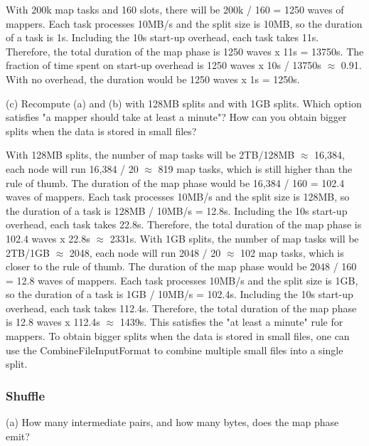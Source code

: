 \documentclass[11pt,a4paper]{article}
\begin{document}
With 200k map tasks and 160 slots, there will be 200k / 160 = 1250 waves of mappers. Each task processes 10MB/s and the split size is 10MB, so the duration of a task is 1s. Including the 10s start-up overhead, each task takes 11s. Therefore, the total duration of the map phase is 1250 waves x 11s = 13750s. 
The fraction of time spent on start-up overhead is 1250 waves x 10s / 13750s $\approx$ 0.91. With no overhead, the duration would be 1250 waves x 1s = 1250s.

\begin{tcolorbox}[colback=gray!20,colframe=gray!20, sharp corners]
(c) Recompute (a) and (b) with 128MB splits and with 1GB splits. Which option satisfies "a mapper should take at least a minute"? How can you obtain bigger splits when the data is stored in small files?
\end{tcolorbox}

With 128MB splits, the number of map tasks will be 2TB/128MB $\approx$ 16,384, each node will run 16,384 / 20 $\approx$ 819 map tasks, which is still higher than the rule of thumb. \newline
The duration of the map phase would be 16,384 / 160 = 102.4 waves of mappers. Each task processes 10MB/s and the split size is 128MB, so the duration of a task is 128MB / 10MB/s = 12.8s. Including the 10s start-up overhead, each task takes 22.8s. Therefore, the total duration of the map phase is 102.4 waves x 22.8s $\approx$ 2331s.\newline
\newline
With 1GB splits, the number of map tasks will be 2TB/1GB $\approx$ 2048, each node will run 2048 / 20 $\approx$ 102 map tasks, which is closer to the rule of thumb. \newline
The duration of the map phase would be 2048 / 160 = 12.8 waves of mappers. Each task processes 10MB/s and the split size is 1GB, so the duration of a task is 1GB / 10MB/s = 102.4s. Including the 10s start-up overhead, each task takes 112.4s. Therefore, the total duration of the map phase is 12.8 waves x 112.4s $\approx$ 1439s.\newline
This satisfies the "at least a minute" rule for mappers. To obtain bigger splits when the data is stored in small files, one can use the CombineFileInputFormat to combine multiple small files into a single split.


\subsubsection*{Shuffle}
\begin{tcolorbox}[colback=gray!20,colframe=gray!20, sharp corners]
(a) How many intermediate pairs, and how many bytes, does the map phase emit?
\end{tcolorbox}
\end{document}
